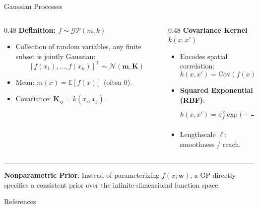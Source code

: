 \documentclass[18pt,aspectratio=149]{beamer}
\begin{document}
\begin{frame}{Gaussian Processes}
    \begin{columns}[T,onlytextwidth]
        \begin{column}{0.48\textwidth}
            \textbf{Definition: $f \sim \mathcal{GP}(m, k)$}
            \begin{itemize}
                \item Collection of random variables, any finite subset is jointly Gaussian:
                \vspace{-0.3em}
                \[
                    [f(x_1), \dots, f(x_n)]^\top \sim \mathcal{N}(\mathbf{m}, \mathbf{K})
                \]
                \vspace{-0.5em}
                \item Mean: $m(x) = \mathbb{E}[f(x)]$ (often $0$).
                \item Covariance: $\mathbf{K}_{ij} = k(x_i, x_j)$.
            \end{itemize}
        \end{column}

        \begin{column}{0.48\textwidth}
            \textbf{Covariance Kernel $k(x, x')$}
            \begin{itemize}
                \item Encodes spatial correlation:
                \vspace{-0.3em}
                \[
                    k(x, x') = \mathrm{Cov}(f(x), f(x'))
                \]
                \vspace{-0.5em}
                \item \textbf{Squared Exponential (RBF)}:
                \vspace{-0.3em}
                \[
                    k(x, x') = \sigma_f^2 \exp\Big(-\frac{\|x - x'\|^2}{2\ell^2}\Big)
                \]
                \vspace{-0.5em}
                \item Lengthscale $\ell$: smoothness / reach.
            \end{itemize}
        \end{column}
    \end{columns}

    \vspace{0.3em}
    \hrule
    \vspace{0.25em}

    \textbf{Nonparametric Prior}: Instead of parameterizing $f(x; \mathbf{w})$, a GP directly specifies a consistent prior over the infinite-dimensional function space.
\end{frame}


\begin{frame}[allowframebreaks]{References}
    \footnotesize
    
    \nocite{*}
    
\end{frame}
\end{document}
